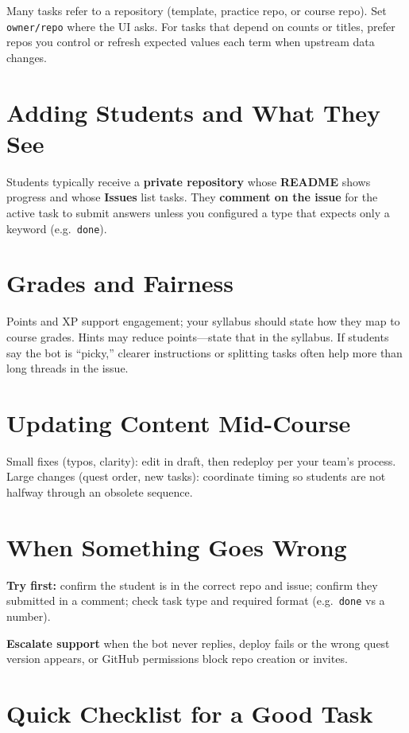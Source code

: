 \documentclass[11pt,a4paper]{article}
\begin{document}
Many tasks refer to a repository (template, practice repo, or course repo). Set \texttt{owner/repo} where the UI asks. For tasks that depend on counts or titles, prefer repos you control or refresh expected values each term when upstream data changes.

\section{Adding Students and What They See}

Students typically receive a \textbf{private repository} whose \textbf{README} shows progress and whose \textbf{Issues} list tasks. They \textbf{comment on the issue} for the active task to submit answers unless you configured a type that expects only a keyword (e.g.\ \texttt{done}).

\section{Grades and Fairness}

Points and XP support engagement; your syllabus should state how they map to course grades. Hints may reduce points---state that in the syllabus. If students say the bot is ``picky,'' clearer instructions or splitting tasks often help more than long threads in the issue.

\section{Updating Content Mid-Course}

Small fixes (typos, clarity): edit in draft, then redeploy per your team's process. Large changes (quest order, new tasks): coordinate timing so students are not halfway through an obsolete sequence.

\section{When Something Goes Wrong}

\textbf{Try first:} confirm the student is in the correct repo and issue; confirm they submitted in a comment; check task type and required format (e.g.\ \texttt{done} vs a number).

\textbf{Escalate support} when the bot never replies, deploy fails or the wrong quest version appears, or GitHub permissions block repo creation or invites.

\section{Quick Checklist for a Good Task}
\end{document}
